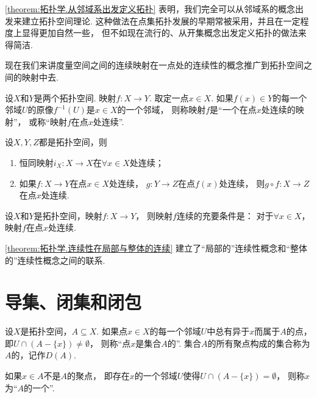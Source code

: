 \cref{theorem:拓扑学.从邻域系出发定义拓扑}
表明，我们完全可以从邻域系的概念出发来建立拓扑空间理论.
这种做法在点集拓扑发展的早期常被采用，并且在一定程度上显得更加自然一些，
但不如现在流行的、从开集概念出发定义拓扑的做法来得简洁.

现在我们来讲度量空间之间的连续映射在一点处的连续性的概念推广到拓扑空间之间的映射中去.

\begin{definition}
设\(X\)和\(Y\)是两个拓扑空间.
映射\(f\colon X \to Y\).
取定一点\(x \in X\).
如果\(f(x) \in Y\)的每一个邻域\(U\)的原像\(f^{-1}(U)\)是\(x \in X\)的一个邻域，
则称映射\(f\)是“一个在点\(x\)处连续的映射”，
或称“映射\(f\)在点\(x\)处连续”.
\end{definition}

\begin{theorem}
设\(X,Y,Z\)都是拓扑空间，则
\begin{enumerate}
	\item 恒同映射\(i_X\colon X \to X\)在\(\forall x \in X\)处连续；
	\item 如果\(f\colon X \to Y\)在点\(x \in X\)处连续，
	\(g\colon Y \to Z\)在点\(f(x)\)处连续，
	则\(g \circ f\colon X \to Z\)在点\(x\)处连续.
\end{enumerate}
\end{theorem}

\begin{theorem}\label{theorem:拓扑学.连续性在局部与整体的连续}
设\(X\)和\(Y\)是拓扑空间，映射\(f\colon X \to Y\)，
则映射\(f\)连续的充要条件是：
对于\(\forall x \in X\)，映射\(f\)在点\(x\)处连续.
\end{theorem}

\cref{theorem:拓扑学.连续性在局部与整体的连续}
建立了“局部的”连续性概念和“整体的”连续性概念之间的联系.

\section{导集、闭集和闭包}
\begin{definition}\label{definition:拓扑学.聚点与孤立点的概念}
设\(X\)是拓扑空间，\(A \subseteq X\).
如果点\(x \in X\)的每一个邻域\(U\)中总有异于\(x\)而属于\(A\)的点，
即\(U \cap (A - \{x\}) \neq \emptyset\)，
则称“点\(x\)是集合\(A\)的”.
集合\(A\)的所有聚点构成的集合称为\(A\)的，记作\(D(A)\).

如果\(x \in A\)不是\(A\)的聚点，
即存在\(x\)的一个邻域\(U\)使得\(U \cap (A - \{x\}) = \emptyset\)，
则称\(x\)为“\(A\)的一个”.
\end{definition}


